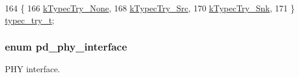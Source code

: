 \begin{DoxyCode}
164 \{
166     \hyperlink{group__usb__pd__stack_gga4794fa8903a011ba6f0be0f04925411eaff14c5fbf053f7e1292cd753ca873a0f}{kTypecTry\_None},
168     \hyperlink{group__usb__pd__stack_gga4794fa8903a011ba6f0be0f04925411ea4326df028c06c1618941dfac6645decd}{kTypecTry\_Src},
170     \hyperlink{group__usb__pd__stack_gga4794fa8903a011ba6f0be0f04925411ea96a98ce2756ccbcd3c300db89ae9be67}{kTypecTry\_Snk},
171 \} \hyperlink{group__usb__pd__stack_ga86c3c8c95607b75c0c75cd2714487497}{typec\_try\_t};
\end{DoxyCode}
\hypertarget{group__usb__pd__stack_ga4aed694f998da91dea8d218596d65c1e}{
\subsubsection[{pd\-\_\-phy\-\_\-interface}]{\setlength{\rightskip}{0pt plus 5cm}enum {\bf pd\-\_\-phy\-\_\-interface}}}\label{group__usb__pd__stack_ga4aed694f998da91dea8d218596d65c1e}


P\-H\-Y interface. 

